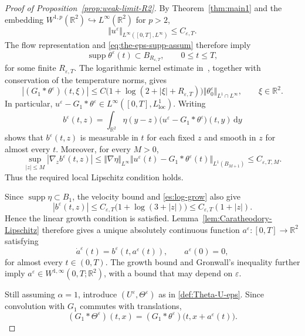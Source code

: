 \documentclass[reqno,11pt,a4paper]{amsart}
\newcommand{\dd}{\mathrm{d}}
\begin{document}
\begin{proof}[Proof of Proposition~\ref{prop:weak-limit-R2}]
By Theorem~\ref{thm:main1} and the embedding
$W^{1,p}(\mathbb R^2)\hookrightarrow L^\infty(\mathbb R^2)$
for $p>2$,
\[
  \Vert u^\varepsilon\Vert _{L^\infty([0,T],L^\infty)}
  \leq C_{\varepsilon,T}.
\]
The flow representation and
\eqref{eq:the-eps-supp-assum} therefore imply
\[
  \operatorname{supp}\theta^\varepsilon(t)
  \subset B_{R_{\varepsilon,T}},
  \qquad 0\leq t\leq T,
\]
for some finite $R_{\varepsilon,T}$.
The logarithmic kernel estimate
in~\cite[Lemma~1]{Gray23}, together with conservation
of the temperature norms, gives
\begin{equation}\label{es:log-grow}
  |(G_1*\theta^\varepsilon)(t,\xi)|
  \leq
  C\bigl(1+\log(2+|\xi|+R_{\varepsilon,T})\bigr)
  \Vert \theta_0^\varepsilon\Vert _{L^1\cap L^\infty},
  \qquad \xi\in\mathbb R^2.
\end{equation}
In particular,
$u^\varepsilon-G_1*\theta^\varepsilon
\in L^\infty([0,T],L^1_{\mathrm{loc}})$.
Writing
\[
  b^\varepsilon(t,z)
  =\int_{\mathbb R^2}\eta(y-z)
  \bigl(u^\varepsilon-G_1*\theta^\varepsilon\bigr)
  (t,y)\,\dd y
\]
shows that $b^\varepsilon(t,z)$ is measurable in $t$
for each fixed $z$ and smooth in $z$ for almost every $t$.
Moreover, for every $M>0$,
\[
  \sup_{|z|\leq M}|\nabla_z b^\varepsilon(t,z)|
  \leq
  \Vert \nabla\eta\Vert _{L^\infty}
  \Vert u^\varepsilon(t)-G_1*\theta^\varepsilon(t)
    \Vert _{L^1(B_{M+1})}
  \leq C_{\varepsilon,T,M}.
\]
Thus the required local Lipschitz condition holds.

Since $\operatorname{supp}\eta\subset B_1$,
the velocity bound and \eqref{es:log-grow} also give
\[
  |b^\varepsilon(t,z)|
  \leq C_{\varepsilon,T}
       \bigl(1+\log(3+|z|)\bigr)
  \leq C_{\varepsilon,T}(1+|z|).
\]
Hence the linear growth condition is satisfied.
Lemma~\ref{lem:Caratheodory-Lipschitz} therefore gives
a unique absolutely continuous function
$a^\varepsilon:[0,T]\to\mathbb R^2$ satisfying
\begin{equation}\label{def:a-eps}
  \dot a^\varepsilon(t)
  =b^\varepsilon(t,a^\varepsilon(t)),
  \qquad a^\varepsilon(0)=0,
\end{equation}
for almost every $t\in(0,T)$.
The growth bound and Gronwall's inequality further imply
$a^\varepsilon\in W^{1,\infty}(0,T;\mathbb R^2)$,
with a bound that may depend on $\varepsilon$.

Still assuming $\alpha=1$, introduce
$(U^\varepsilon,\Theta^\varepsilon)$ as in
\eqref{def:Theta-U-eps}.
Since convolution with $G_1$ commutes with translations,
\[
  (G_1*\Theta^\varepsilon)(t,x)
  =(G_1*\theta^\varepsilon)
    \bigl(t,x+a^\varepsilon(t)\bigr).
\]




\end{proof}
\end{document}
